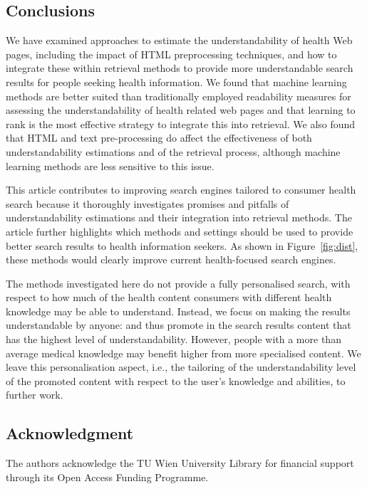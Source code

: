 \documentclass[10pt,a4paper]{article}
\begin{document}
\subsection*{Conclusions}

We have examined approaches to estimate the understandability of health Web pages, including the impact of HTML preprocessing techniques, and how to integrate these within retrieval methods to provide more understandable search results for people seeking health information. We found that machine learning methods are better suited than traditionally employed readability measures for assessing the understandability of health related web pages and that learning to rank is the most effective strategy to integrate this into retrieval. We also found that HTML and text pre-processing do affect the effectiveness of both understandability estimations and of the retrieval process, although machine learning methods are less sensitive to this issue.

This article contributes to improving search engines tailored to consumer health search because it thoroughly investigates promises and pitfalls of understandability estimations and their integration into retrieval methods. The article further highlights which methods and settings should be used to provide better search results to health information seekers. As shown in Figure~\ref{fig:dist}, these methods would clearly improve current health-focused search engines. 

The methods investigated here do not provide a fully personalised search, with respect to how much of the health content consumers with different health knowledge may be able to understand. Instead, we focus on making the results understandable by anyone: and thus promote in the search results content that has the highest level of understandability. However, people with a more than average medical knowledge may benefit higher from more specialised content. We leave this personalisation aspect, i.e., the tailoring of the understandability level of the promoted content with respect to the user's knowledge and abilities, to further work.

\subsection*{Acknowledgment}
The authors acknowledge the TU Wien University Library for financial support through its Open Access Funding Programme.
\end{document}
